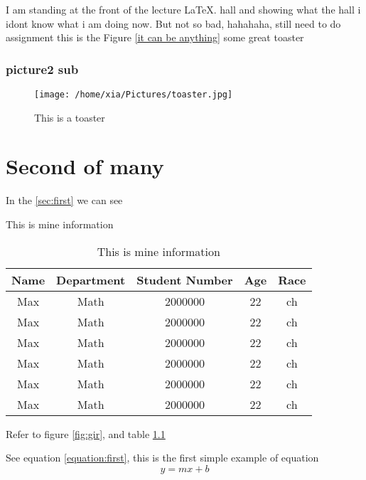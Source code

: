 \documentclass[12pt,letterpaper,onecolumn]{report}
\begin{document}
\noindent I am standing at the front of the lecture \LaTeX . hall and showing what the hall i idont know what i am doing now. But not so bad, hahahaha, still need to do assignment  this is the Figure \ref{it can be anything} some great toaster\\

\subsection{picture2 sub}
\label{subsec:pic2sub}

\begin{figure}[!ht] %
\caption{This is a toaster} %
\raggedright %
\texttt{[image: /home/xia/Pictures/toaster.jpg]}
\end{figure}

\chapter{Second of many}
\label{chap:second}
\noindent In the \ref{sec:first} we can see
\begin{table}[!ht]
\centering
\caption{This is mine information} %
\begin{tabular}{|c|c |c |c| c |} %
\hline %
Name & Department & Student Number & Age &Race\\
\hline
\hline
Max & Math & 2000000 & 22 & ch\\
\hline
Max & Math & 2000000 & 22 & ch\\
\hline
Max & Math & 2000000 & 22 & ch\\
\hline
Max & Math & 2000000 & 22 & ch\\
\hline
Max & Math & 2000000 & 22 & ch\\
\hline
Max & Math & 2000000 & 22 & ch\\
\hline
\end{tabular}
\caption{This is mine information}
\label{tab:tab1}
\end{table}
Refer to figure \ref{fig:gir}, and table \ref{tab:tab1} %



\newpage


See equation \ref{equation:first}, this is the first simple example of equation
\begin{equation}
y=mx+b
\label{equation:first}
\end{equation}
\end{document}
